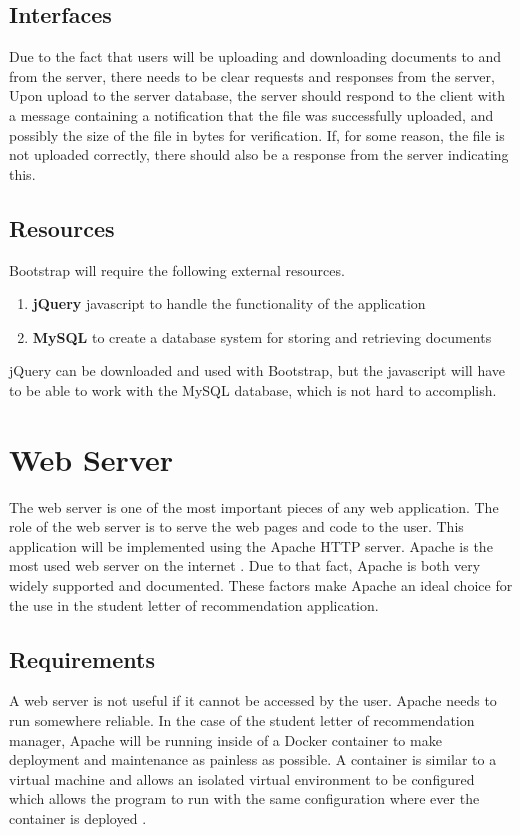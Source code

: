 \documentclass[onecolumn, draftclsnofoot,10pt, compsoc]{IEEEtran}
\begin{document}
\subsection{Interfaces}
Due to the fact that users will be uploading and downloading documents to and from the server, there needs to be clear requests and responses from the server, Upon upload to the server database, the server should respond to the client with a message containing a notification that the file was successfully uploaded, and possibly the size of the file in bytes for verification. If, for some reason, the file is not uploaded correctly, there should also be a response from the server indicating this.

\subsection{Resources}
Bootstrap will require the following external resources.
\begin{enumerate}
    \item \textbf{jQuery} javascript to handle the functionality of the application
    \item \textbf{MySQL} to create a database system for storing and retrieving documents
\end{enumerate}

jQuery can be downloaded and used with Bootstrap, but the javascript will have to be able to work with the MySQL database, which is not hard to accomplish.


\section{Web Server}
The web server is one of the most important pieces of any web application. The role of the web server is to serve the web pages and code to the user. This application will be implemented using the Apache HTTP server. Apache is the most used web server on the internet \cite{webserverstats}. Due to that fact, Apache is both very widely supported and documented. These factors make Apache an ideal choice for the use in the student letter of recommendation application.

\subsection{Requirements}
A web server is not useful if it cannot be accessed by the user. Apache needs to run somewhere reliable. In the case of the student letter of recommendation manager, Apache will be running inside of a Docker container to make deployment and maintenance as painless as possible. A container is similar to a virtual machine and allows an isolated virtual environment to be configured which allows the program to run with the same configuration where ever the container is deployed \cite{docker}.
\end{document}
